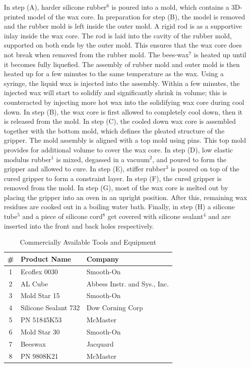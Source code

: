 In step (A), harder silicone rubber$^6$ is poured into a mold, which contains a 3D-printed model of the wax core.
In preparation for step (B), the model is removed and the rubber mold is left inside the outer mold.
A rigid rod is  as a supportive inlay inside the wax core.
The rod is laid into the cavity of the rubber mold, supported on both ends by the outer mold.
This ensures that the wax core does not break when removed from the rubber mold.
The bees-wax$^{7}$ is heated up until it becomes fully liquefied.
The assembly of rubber mold and outer mold is then heated up for a few minutes to the same temperature as the wax.
Using a syringe, the liquid wax is injected into the assembly.
Within a few minutes, the injected wax will start to solidify and significantly shrink in volume; this is counteracted by injecting more hot wax into the solidifying wax core during cool down.
In step (B), the wax core is first allowed to completely cool down, then it is released from the mold.
In step (C), the cooled down wax core is assembled together with the bottom mold, which defines the pleated structure of the gripper.
The mold assembly is aligned with a top mold using pins. This top mold provides for additional volume to cover the wax core.
In step (D), low elastic modulus rubber$^1$ is mixed, degassed in a vacuum$^2$, and poured to form the gripper and allowed to cure.
In step (E), stiffer rubber$^3$ is poured on top of the cured gripper to form a constraint layer.
In step (F), the cured gripper is removed from the mold.
In step (G), most of the wax core is melted out by placing the gripper into an oven in an upright position.
After this, remaining wax residues are cooked out in a boiling water bath.
Finally, in step (H) a silicone tube$^5$ and a piece of silicone cord$^{8}$ get covered with silicone sealant$^4$ and are inserted into the front and back holes respectively.

\begin{table}[h]
\caption{Commercially Available Tools and Equipment}
\centering
\begin{tabular}{c l l}
\hline
\hline
\# & Product Name & Company\\
\hline
1 & Ecoflex 0030&  Smooth-On\\
2 & AL Cube & Abbess Instr. and Sys., Inc.\\
3 & Mold Star 15 & Smooth-On\\
4 & Silicone Sealant 732 & Dow Corning Corp\\
5 & PN 51845K53 & McMaster\\
6 & Mold Star 30 & Smooth-On\\
7 & Beeswax & Jacquard\\
8 & PN 9808K21& McMaster\\
\hline
\end{tabular}
\label{tab:MachineTools}
\end{table}


